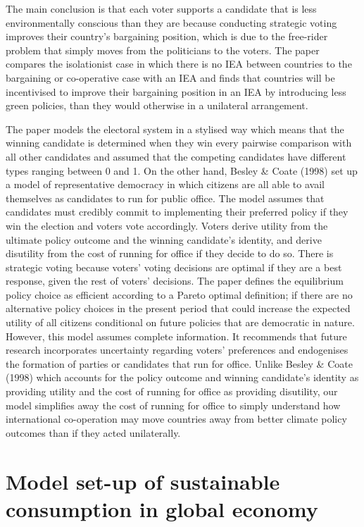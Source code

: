 \documentclass[11pt,preprint, authoryear]{elsarticle}
\numberwithin{equation}{section}
\numberwithin{figure}{section}
\numberwithin{table}{section}
\begin{document}
The main conclusion is that each voter supports a candidate that is less
environmentally conscious than they are because conducting strategic
voting improves their country's bargaining position, which is due to the
free-rider problem that simply moves from the politicians to the voters.
The paper compares the isolationist case in which there is no IEA
between countries to the bargaining or co-operative case with an IEA and
finds that countries will be incentivised to improve their bargaining
position in an IEA by introducing less green policies, than they would
otherwise in a unilateral arrangement.

The paper models the electoral system in a stylised way which means that
the winning candidate is determined when they win every pairwise
comparison with all other candidates and assumed that the competing
candidates have different types ranging between 0 and 1. On the other
hand, Besley \& Coate (1998) set up a model of representative democracy
in which citizens are all able to avail themselves as candidates to run
for public office. The model assumes that candidates must credibly
commit to implementing their preferred policy if they win the election
and voters vote accordingly. Voters derive utility from the ultimate
policy outcome and the winning candidate's identity, and derive
disutility from the cost of running for office if they decide to do so.
There is strategic voting because voters' voting decisions are optimal
if they are a best response, given the rest of voters' decisions. The
paper defines the equilibrium policy choice as efficient according to a
Pareto optimal definition; if there are no alternative policy choices in
the present period that could increase the expected utility of all
citizens conditional on future policies that are democratic in nature.
However, this model assumes complete information. It recommends that
future research incorporates uncertainty regarding voters' preferences
and endogenises the formation of parties or candidates that run for
office. Unlike Besley \& Coate (1998) which accounts for the policy
outcome and winning candidate's identity as providing utility and the
cost of running for office as providing disutility, our model simplifies
away the cost of running for office to simply understand how
international co-operation may move countries away from better climate
policy outcomes than if they acted unilaterally.

\hypertarget{model-set-up-of-sustainable-consumption-in-global-economy}{%
\section{Model set-up of sustainable consumption in global
economy}\label{model-set-up-of-sustainable-consumption-in-global-economy}}
\end{document}
